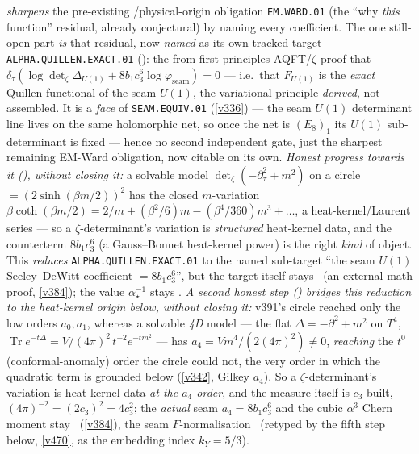 \documentclass[11pt,a4paper]{article}
\newcommand{\cthree}{c_3}
\newcommand{\ainv}{\alpha^{-1}_\star}
\theoremstyle{definition}
\begin{document}
\emph{sharpens} the pre-existing \mO/physical-origin obligation \texttt{EM.WARD.01} (the ``why \emph{this}
function'' residual, already conjectural) by naming every coefficient. The one still-open part \emph{is} that
residual, now \emph{named} as its own tracked target \texttt{ALPHA.QUILLEN.EXACT.01}
(): the from-first-principles AQFT/$\zeta$ proof that
$\delta_\tau(\log\det\nolimits_\zeta\Delta_{U(1)}+8b_1\cthree^6\log\varphi_{\mathrm{seam}})=0$ --- i.e.\ that
$F_{U(1)}$ is the \emph{exact} Quillen functional of the seam $U(1)$, the variational principle \emph{derived}, not
assembled. It is a \emph{face} of \texttt{SEAM.EQUIV.01} (\vref{v336}) --- the seam $U(1)$ determinant line lives on
the same holomorphic net, so once the net is $(E_8)_1$ its $U(1)$ sub-determinant is fixed --- hence no second
independent gate, just the sharpest remaining EM-Ward obligation, now citable on its own.
\emph{Honest progress towards it (), without closing it:} a solvable
model $\det_\zeta(-\partial_\tau^2{+}m^2)$ on a circle $=(2\sinh(\beta m/2))^2$ has the closed $m$-variation
$\beta\coth(\beta m/2)=2/m+(\beta^2/6)m-(\beta^4/360)m^3+\dots$, a heat-kernel/Laurent series --- so a
$\zeta$-determinant's variation is \emph{structured} heat-kernel data, and the counterterm $8b_1\cthree^6$ (a
Gauss--Bonnet heat-kernel power) is the right \emph{kind} of object. This \emph{reduces}
\texttt{ALPHA.QUILLEN.EXACT.01} to the named sub-target ``the seam $U(1)$ Seeley--DeWitt coefficient $=8b_1\cthree^6$'',
but the target itself stays \mO\ (an external math proof, \vref{v384}); the value $\ainv$ stays \mE.
\emph{A second honest step () bridges this reduction to the heat-kernel
origin below, without closing it:} v391's circle reached only the low orders $a_0,a_1$, whereas a solvable \emph{4D}
model --- the flat $\Delta=-\partial^2{+}m^2$ on $T^4$, $\operatorname{Tr}e^{-t\Delta}=V/(4\pi)^2\,t^{-2}e^{-tm^2}$
--- has $a_4=Vm^4/(2(4\pi)^2)\neq0$, \emph{reaching} the $t^0$ (conformal-anomaly) order the circle could not, the
very order in which the quadratic term is grounded below (\vref{v342}, Gilkey $a_4$). So a $\zeta$-determinant's
variation is heat-kernel data \emph{at the $a_4$ order}, and the measure itself is $\cthree$-built,
$(4\pi)^{-2}=(2\cthree)^2=4\cthree^2$; the \emph{actual} seam $a_4=8b_1\cthree^6$ and the cubic $\alpha^3$ Chern
moment stay \mO\ (\vref{v384}), the seam $F$-normalisation \mC\ (retyped by the fifth step below,
\vref{v470}, as the embedding index $k_Y{=}5/3$).
\end{document}
